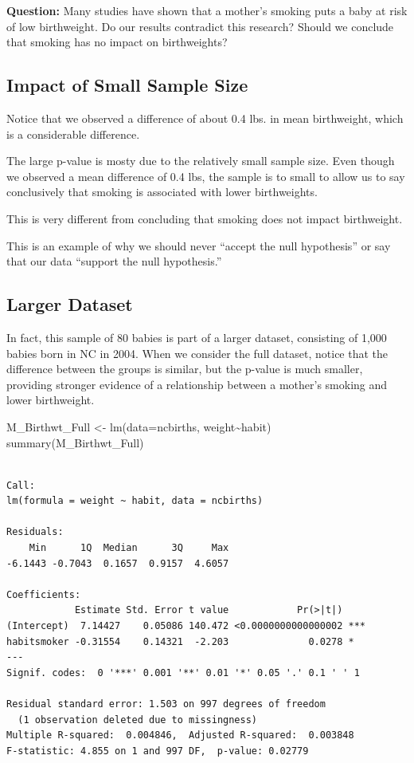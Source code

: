 \documentclass[
  letterpaper,
  DIV=11,
  numbers=noendperiod]{scrreprt}
\newenvironment{Shaded}{\begin{snugshade}}{\end{snugshade}}
\newcommand{\AttributeTok}[1]{\textcolor[rgb]{0.40,0.45,0.13}{#1}}
\newcommand{\FunctionTok}[1]{\textcolor[rgb]{0.28,0.35,0.67}{#1}}
\newcommand{\NormalTok}[1]{\textcolor[rgb]{0.00,0.23,0.31}{#1}}
\newcommand{\OtherTok}[1]{\textcolor[rgb]{0.00,0.23,0.31}{#1}}
\newcommand{\SpecialCharTok}[1]{\textcolor[rgb]{0.37,0.37,0.37}{#1}}
\begin{document}
\textbf{Question:} Many studies have shown that a mother's smoking puts
a baby at risk of low birthweight. Do our results contradict this
research? Should we conclude that smoking has no impact on birthweights?

\subsection{Impact of Small Sample
Size}\label{impact-of-small-sample-size}

Notice that we observed a difference of about 0.4 lbs. in mean
birthweight, which is a considerable difference.

The large p-value is mosty due to the relatively small sample size. Even
though we observed a mean difference of 0.4 lbs, the sample is to small
to allow us to say conclusively that smoking is associated with lower
birthweights.

This is very different from concluding that smoking does not impact
birthweight.

This is an example of why we should never ``accept the null hypothesis''
or say that our data ``support the null hypothesis.''

\subsection{Larger Dataset}\label{larger-dataset}

In fact, this sample of 80 babies is part of a larger dataset,
consisting of 1,000 babies born in NC in 2004. When we consider the full
dataset, notice that the difference between the groups is similar, but
the p-value is much smaller, providing stronger evidence of a
relationship between a mother's smoking and lower birthweight.

\begin{Shaded}
\begin{Highlighting}[]
\NormalTok{M\_Birthwt\_Full }\OtherTok{\textless{}{-}} \FunctionTok{lm}\NormalTok{(}\AttributeTok{data=}\NormalTok{ncbirths, weight}\SpecialCharTok{\textasciitilde{}}\NormalTok{habit)}
\FunctionTok{summary}\NormalTok{(M\_Birthwt\_Full)}
\end{Highlighting}
\end{Shaded}

\begin{verbatim}

Call:
lm(formula = weight ~ habit, data = ncbirths)

Residuals:
    Min      1Q  Median      3Q     Max 
-6.1443 -0.7043  0.1657  0.9157  4.6057 

Coefficients:
            Estimate Std. Error t value            Pr(>|t|)    
(Intercept)  7.14427    0.05086 140.472 <0.0000000000000002 ***
habitsmoker -0.31554    0.14321  -2.203              0.0278 *  
---
Signif. codes:  0 '***' 0.001 '**' 0.01 '*' 0.05 '.' 0.1 ' ' 1

Residual standard error: 1.503 on 997 degrees of freedom
  (1 observation deleted due to missingness)
Multiple R-squared:  0.004846,  Adjusted R-squared:  0.003848 
F-statistic: 4.855 on 1 and 997 DF,  p-value: 0.02779
\end{verbatim}
\end{document}
